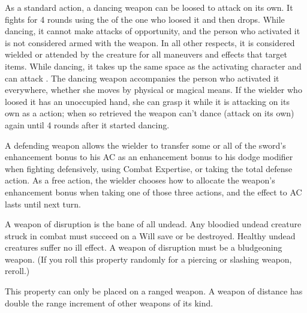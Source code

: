 
 As a standard action, a dancing weapon can be loosed to attack on its own. It fights for 4 rounds using the  of the one who loosed it and then drops. While dancing, it cannot make attacks of opportunity, and the person who activated it is not considered armed with the weapon. In all other respects, it is considered wielded or attended by the creature for all maneuvers and effects that target items. While dancing, it takes up the same space as the activating character and can attack . The dancing weapon accompanies the person who activated it everywhere, whether she moves by physical or magical means. If the wielder who loosed it has an unoccupied hand, she can grasp it while it is attacking on its own as a  action; when so retrieved the weapon can't dance (attack on its own) again until 4 rounds after it started dancing.


 A defending weapon allows the wielder to transfer some or all of the sword's enhancement bonus to his AC as an enhancement bonus to his dodge modifier when fighting defensively, using Combat Expertise, or taking the total defense action. As a free action, the wielder chooses how to allocate the weapon's enhancement bonus when taking one of those three actions, and the effect to AC lasts until  next turn.


 A weapon of disruption is the bane of all undead. Any bloodied undead creature struck in combat must succeed on a Will save or be destroyed. Healthy undead creatures suffer no ill effect. A weapon of disruption must be a bludgeoning weapon. (If you roll this property randomly for a piercing or slashing weapon, reroll.)


 This property can only be placed on a ranged weapon. A weapon of distance has double the range increment of other weapons of its kind.


